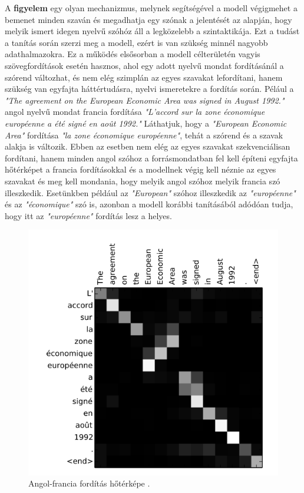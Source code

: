 A \textbf{figyelem} egy olyan mechanizmus, melynek segítségével a modell végigmehet a bemenet minden szaván és megadhatja egy szónak a jelentését az alapján, hogy melyik ismert idegen nyelvű szóhóz áll a legközelebb a szintaktikája. Ezt a tudást a tanítás során szerzi meg a modell, ezért is van szükség minnél nagyobb adathalmazokra. Ez a működés elsősorban a modell célterületén vagyis  szövegfordítások esetén hasznos, ahol egy adott nyelvű mondat fordításánál a szórend változhat, és nem elég szimplán az egyes szavakat lefordítani, hanem szükség van egyfajta háttértudásra, nyelvi ismeretekre a fordítás során. Pélául a \textit{"The agreement on the European Economic Area was signed in August 1992."} angol nyelvű mondat francia fordítása \textit{"L'accord sur la zone économique européenne a été signé en août 1992."} Láthatjuk, hogy a \textit{"European Economic Area"} fordítása \textit{"la zone économique européenne"}, tehát a szórend és a szavak alakja is változik. Ebben az esetben nem elég az egyes szavakat szekvenciálisan fordítani, hanem minden angol szóhoz a forrásmondatban fel kell építeni egyfajta hőtérképet a francia fordításokkal és a modellnek végig kell néznie az egyes szavakat és meg kell mondania, hogy melyik angol szóhoz melyik francia szó illeszkedik. Esetünkben például az \textit{"European"} szóhoz illeszkedik az \textit{"européenne"} és az \textit{"économique"} szó is, azonban a modell korábbi tanításából adódóan tudja, hogy itt az \textit{"européenne"} fordítás lesz a helyes.

\begin{figure}[h]
\centering
\includegraphics[scale=0.9]{images/translate_heatmap.png}
\caption{Angol-francia fordítás hőtérképe \cite{translation}.}
\label{fig:translate_heatmap}
\end{figure}

